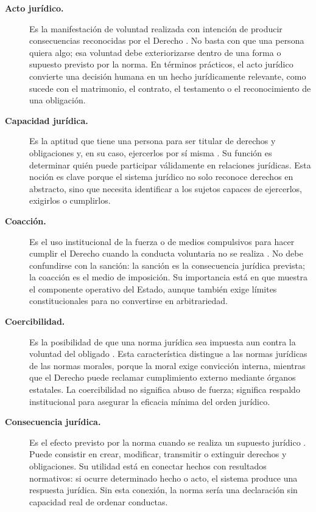 \documentclass[
	spanish,
	letterpaper, oneside
]{article}
\begin{document}
\begin{description}

\item[\textbf{Acto jurídico.}]
Es la manifestación de voluntad realizada con intención de producir consecuencias reconocidas por el Derecho \citep{garciaMaynez2002,poderJudicialGto2007}. No basta con que una persona quiera algo; esa voluntad debe exteriorizarse dentro de una forma o supuesto previsto por la norma. En términos prácticos, el acto jurídico convierte una decisión humana en un hecho jurídicamente relevante, como sucede con el matrimonio, el contrato, el testamento o el reconocimiento de una obligación.

\item[\textbf{Capacidad jurídica.}]
Es la aptitud que tiene una persona para ser titular de derechos y obligaciones y, en su caso, ejercerlos por sí misma \citep{garciaMaynez2002,poderJudicialGto2007}. Su función es determinar quién puede participar válidamente en relaciones jurídicas. Esta noción es clave porque el sistema jurídico no solo reconoce derechos en abstracto, sino que necesita identificar a los sujetos capaces de ejercerlos, exigirlos o cumplirlos.

\item[\textbf{Coacción.}]
Es el uso institucional de la fuerza o de medios compulsivos para hacer cumplir el Derecho cuando la conducta voluntaria no se realiza \citep{poderJudicialGto2007,garciaMaynez2002}. No debe confundirse con la sanción: la sanción es la consecuencia jurídica prevista; la coacción es el medio de imposición. Su importancia está en que muestra el componente operativo del Estado, aunque también exige límites constitucionales para no convertirse en arbitrariedad.

\item[\textbf{Coercibilidad.}]
Es la posibilidad de que una norma jurídica sea impuesta aun contra la voluntad del obligado \citep{garciaMaynez2002,launDerechoMoral2021}. Esta característica distingue a las normas jurídicas de las normas morales, porque la moral exige convicción interna, mientras que el Derecho puede reclamar cumplimiento externo mediante órganos estatales. La coercibilidad no significa abuso de fuerza; significa respaldo institucional para asegurar la eficacia mínima del orden jurídico.

\item[\textbf{Consecuencia jurídica.}]
Es el efecto previsto por la norma cuando se realiza un supuesto jurídico \citep{garciaMaynez2002,poderJudicialGto2007}. Puede consistir en crear, modificar, transmitir o extinguir derechos y obligaciones. Su utilidad está en conectar hechos con resultados normativos: si ocurre determinado hecho o acto, el sistema produce una respuesta jurídica. Sin esta conexión, la norma sería una declaración sin capacidad real de ordenar conductas.


\end{description}
\end{document}
